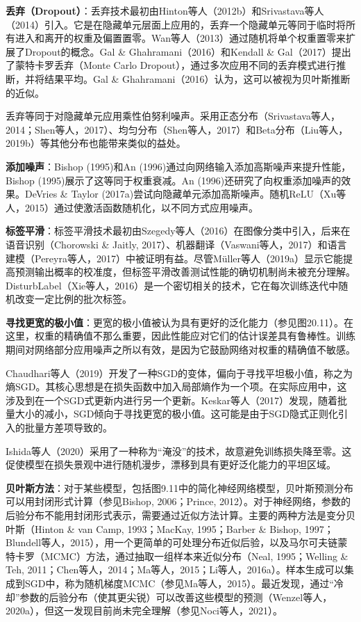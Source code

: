 \documentclass[lang=cn,newtx,10pt,scheme=chinese]{elegantbook}
\begin{document}
\textbf{丢弃（Dropout）}：丢弃技术最初由Hinton等人（2012b）和Srivastava等人（2014）引入。它是在隐藏单元层面上应用的，丢弃一个隐藏单元等同于临时将所有进入和离开的权重及偏置置零。Wan等人（2013）通过随机将单个权重置零来扩展了Dropout的概念。Gal \& Ghahramani（2016）和Kendall \& Gal（2017）提出了蒙特卡罗丢弃（Monte Carlo Dropout），通过多次应用不同的丢弃模式进行推断，并将结果平均。Gal \& Ghahramani（2016）认为，这可以被视为贝叶斯推断的近似。

丢弃等同于对隐藏单元应用乘性伯努利噪声。采用正态分布（Srivastava等人，2014；Shen等人，2017）、均匀分布（Shen等人，2017）和Beta分布（Liu等人，2019b）等其他分布也能带来类似的益处。

\textbf{添加噪声}：Bishop (1995)和An (1996)通过向网络输入添加高斯噪声来提升性能，Bishop (1995)展示了这等同于权重衰减。An (1996)还研究了向权重添加噪声的效果。DeVries \& Taylor (2017a)尝试向隐藏单元添加高斯噪声。随机ReLU（Xu等人，2015）通过使激活函数随机化，以不同方式应用噪声。

\textbf{标签平滑}：标签平滑技术最初由Szegedy等人（2016）在图像分类中引入，后来在语音识别（Chorowski \& Jaitly, 2017）、机器翻译（Vaswani等人，2017）和语言建模（Pereyra等人，2017）中被证明有益。尽管Müller等人（2019a）显示它能提高预测输出概率的校准度，但标签平滑改善测试性能的确切机制尚未被充分理解。DisturbLabel（Xie等人，2016）是一个密切相关的技术，它在每次训练迭代中随机改变一定比例的批次标签。

\textbf{寻找更宽的极小值}：更宽的极小值被认为具有更好的泛化能力（参见图20.11）。在这里，权重的精确值不那么重要，因此性能应对它们的估计误差具有鲁棒性。训练期间对网络部分应用噪声之所以有效，是因为它鼓励网络对权重的精确值不敏感。

Chaudhari等人（2019）开发了一种SGD的变体，偏向于寻找平坦极小值，称之为熵SGD。其核心思想是在损失函数中加入局部熵作为一个项。在实际应用中，这涉及到在一个SGD式更新内进行另一个更新。Keskar等人（2017）发现，随着批量大小的减小，SGD倾向于寻找更宽的极小值。这可能是由于SGD隐式正则化引入的批量方差项导致的。

Ishida等人（2020）采用了一种称为“淹没”的技术，故意避免训练损失降至零。这促使模型在损失景观中进行随机漫步，漂移到具有更好泛化能力的平坦区域。

\textbf{贝叶斯方法}：对于某些模型，包括图9.11中的简化神经网络模型，贝叶斯预测分布可以用封闭形式计算（参见Bishop, 2006；Prince, 2012）。对于神经网络，参数的后验分布不能用封闭形式表示，需要通过近似方法计算。主要的两种方法是变分贝叶斯（Hinton \& van Camp, 1993；MacKay, 1995；Barber \& Bishop, 1997；Blundell等人，2015），用一个更简单的可处理分布近似后验，以及马尔可夫链蒙特卡罗（MCMC）方法，通过抽取一组样本来近似分布（Neal, 1995；Welling \& Teh, 2011；Chen等人，2014；Ma等人，2015；Li等人，2016a）。样本生成可以集成到SGD中，称为随机梯度MCMC（参见Ma等人，2015）。最近发现，通过“冷却”参数的后验分布（使其更尖锐）可以改善这些模型的预测（Wenzel等人，2020a），但这一发现目前尚未完全理解（参见Noci等人，2021）。
\end{document}
